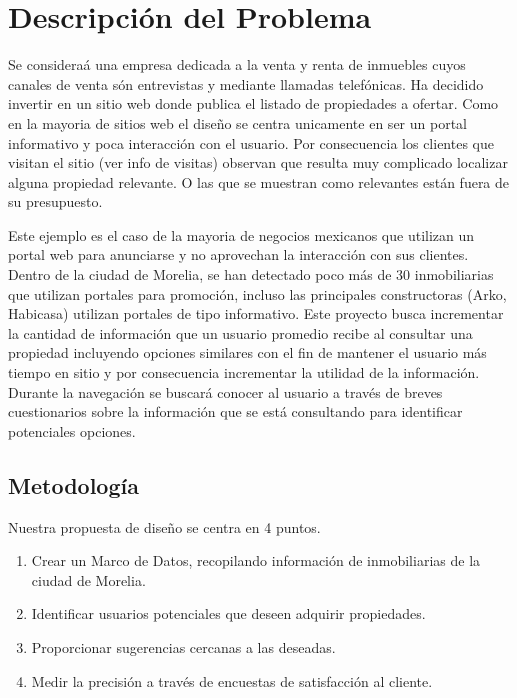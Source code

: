 \section{Descripción del Problema}\label{descripciuxf3n-del-problema}

Se consideraá una empresa dedicada a la venta y renta de inmuebles cuyos canales  de venta són  entrevistas y mediante llamadas telefónicas. Ha decidido invertir en un sitio web donde publica el listado de propiedades a ofertar. Como en la mayoria de sitios web el diseño se centra unicamente en ser un portal informativo y poca interacción con el usuario. Por consecuencia los clientes que visitan el sitio (ver info de visitas) observan que resulta muy complicado localizar alguna propiedad relevante. O las que se muestran como relevantes están fuera de su presupuesto.

Este ejemplo es el caso de la mayoria de negocios mexicanos que utilizan un portal web para anunciarse y no aprovechan la interacción con sus clientes.
Dentro de la ciudad de Morelia, se han detectado poco más de 30 inmobiliarias que utilizan portales para promoción, incluso las principales constructoras (Arko, Habicasa) utilizan  portales de tipo informativo. Este proyecto busca incrementar la cantidad de información que un usuario promedio recibe al consultar una propiedad incluyendo opciones similares con el fin de mantener el usuario más tiempo en sitio y por consecuencia incrementar la utilidad de la información. Durante la navegación se buscará conocer al usuario a través de breves cuestionarios sobre la información que se está consultando para identificar potenciales opciones. 

\subsection{Metodología}

Nuestra propuesta de diseño se centra en 4 puntos.
\begin{enumerate}
\item Crear un Marco de Datos, recopilando información de inmobiliarias de la ciudad de Morelia.
\item Identificar usuarios potenciales que deseen adquirir propiedades.
\item Proporcionar sugerencias cercanas a las deseadas.
\item Medir la precisión a través de encuestas de satisfacción al cliente.
\end{enumerate}


